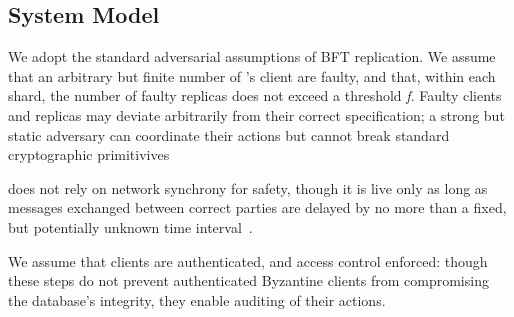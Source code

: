 
\subsection{System Model}

We adopt the standard adversarial assumptions of BFT replication. We assume that an arbitrary but finite number of \sys's client are faulty, and that, within each shard, the number of faulty replicas does not exceed a threshold \textit{f}. Faulty clients and replicas may deviate arbitrarily from their correct specification; a strong but static adversary can coordinate their actions but cannot break standard cryptographic primitivives

\sys{} does not rely on network synchrony for safety, though it is live only as long as messages exchanged between correct parties are delayed by no more than a fixed, but potentially unknown time interval~\cite{castro1999practical, fischer1985impossibility, kotla2007zyzzyva, clement2009making, buchman2016tendermint}.

We assume that clients are authenticated, and access control enforced: though these steps do not prevent  authenticated Byzantine clients from compromising the database's integrity, they enable auditing of their actions. 



